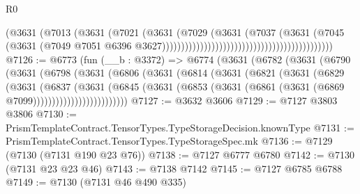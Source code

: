 \begin{lexlean}{R0}
\begin{coremodule}
                                                                      (@3631
                                                                        (@7013
                                                                          (@3631
                                                                            (@7021
                                                                              (@3631
                                                                                (@7029
                                                                                  (@3631
                                                                                    (@7037
                                                                                      (@3631
                                                                                        (@7045
                                                                                          (@3631
                                                                                            (@7049
                                                                                              @7051
                                                                                              @6396
                                                                                              @3627)))))))))))))))))))))))))))))))))))))))))))))
@7126 := @6773
    (fun (__b : @3372) =>
    @6774
      (@3631
        (@6782
          (@3631
            (@6790
              (@3631
                (@6798
                  (@3631
                    (@6806
                      (@3631
                        (@6814
                          (@3631
                            (@6821
                              (@3631
                                (@6829
                                  (@3631
                                    (@6837
                                      (@3631
                                        (@6845
                                          (@3631
                                            (@6853
                                              (@3631
                                                (@6861 (@3631 (@6869 @7099)))))))))))))))))))))))))
@7127 := @3632 @3606
@7129 := @7127 @3803 @3806
@7130 := PrismTemplateContract.TensorTypes.TypeStorageDecision.knownType
@7131 := PrismTemplateContract.TensorTypes.TypeStorageSpec.mk
@7136 := @7129 (@7130 (@7131 @190 @23 @76))
@7138 := @7127 @6777 @6780
@7142 := @7130 (@7131 @23 @23 @46)
@7143 := @7138 @7142
@7145 := @7127 @6785 @6788
@7149 := @7130 (@7131 @46 @490 @335)

\end{coremodule}
\end{lexlean}
